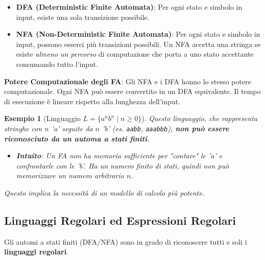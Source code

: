 \documentclass[a4paper]{article}
\newtheorem{example}{Esempio}
\begin{document}
\begin{itemize}
    \item \textbf{DFA (Deterministic Finite Automata)}: Per ogni stato e simbolo in input, esiste una sola transizione possibile.
    \item \textbf{NFA (Non-Deterministic Finite Automata)}: Per ogni stato e simbolo in input, possono esserci più transizioni possibili. Un NFA accetta una stringa se esiste \emph{almeno un percorso} di computazione che porta a uno stato accettante consumando tutto l'input.
\end{itemize}

\textbf{Potere Computazionale degli FA}:
Gli NFA e i DFA hanno lo stesso potere computazionale. Ogni NFA può essere convertito in un DFA equivalente. Il tempo di esecuzione è lineare rispetto alla lunghezza dell'input.

\begin{example}[Linguaggio $L = \{a^n b^n \mid n \ge 0\}$]
    Questo linguaggio, che rappresenta stringhe con $n$ 'a' seguite da $n$ 'b' (es. \texttt{aabb}, \texttt{aaabbb}), \textbf{non può essere riconosciuto da un automa a stati finiti}.
    \begin{itemize}
        \item \textbf{Intuito}: Un FA non ha memoria sufficiente per "contare" le 'a' e confrontarle con le 'b'. Ha un numero finito di stati, quindi non può memorizzare un numero arbitrario $n$.
    \end{itemize}
    Questo implica la necessità di un modello di calcolo più potente.
\end{example}

\subsection{Linguaggi Regolari ed Espressioni Regolari}
Gli automi a stati finiti (DFA/NFA) sono in grado di riconoscere tutti e soli i \textbf{linguaggi regolari}.
\end{document}
